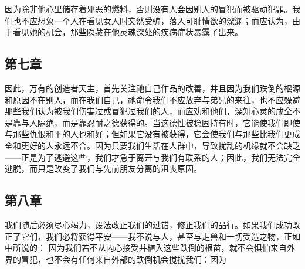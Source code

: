 \par

因为除非他心里储存着邪恶的燃料，否则没有人会因别人的冒犯而被驱动犯罪。我们也不应想象一个人在看见女人时突然受骗，落入可耻情欲的深渊；而应认为，由于看见她的机会，那些隐藏在他灵魂深处的疾病症状暴露了出来。\par


\subsection{第七章}

\par

因此，万有的创造者天主，首先关注祂自己作品的改善，并且因为我们跌倒的根源和原因不在别人，而在我们自己，祂命令我们不应放弃与弟兄的来往，也不应躲避那些我们认为被我们伤害过或冒犯过我们的人，而应劝和他们，深知心灵的成全不是靠与人隔绝，而是靠忍耐之德获得的。当这德性被稳固持有时，它能使我们即使与那些仇恨和平的人也和好；但如果它没有被获得，它会使我们与那些比我们更成全和更好的人永远不合。因为只要我们生活在人群中，导致扰乱的机缘就不会缺乏——正是为了逃避这些，我们才急于离开与我们有联系的人；因此，我们无法完全逃脱，而只是改变了我们与先前朋友分离的沮丧原因。\par


\subsection{第八章}

\par

我们随后必须尽心竭力，设法改正我们的过错，修正我们的品行。如果我们成功改正了它们，我们必将获得平安——我不说与人，甚至与走兽和一切受造之物，正如中所说的：  因为我们若不从内心接受并植入这些跌倒的根苗，就不会惧怕来自外界的冒犯，也不会有任何来自外部的跌倒机会搅扰我们：因为\par


